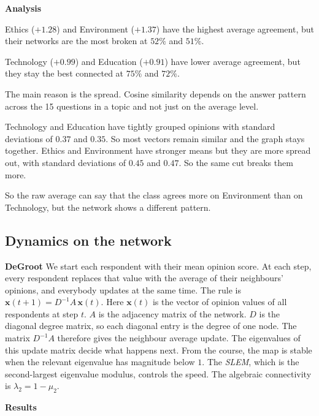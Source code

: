 \documentclass[11pt,a4paper]{article}
\newcommand{\lab}[1]{\textbf{#1}}
\begin{document}
\lab{Analysis}
\begin{dash}
  \item Ethics ($+1.28$) and Environment ($+1.37$) have the highest average
  agreement, but their networks are the most broken at $52\%$ and $51\%$.
  \item Technology ($+0.99$) and Education ($+0.91$) have lower average
  agreement, but they stay the best connected at $75\%$ and $72\%$.
  \item The main reason is the spread. Cosine similarity depends on the answer
  pattern across the 15 questions in a topic and not just on the average level.
  \item Technology and Education have tightly grouped opinions with standard
  deviations of $0.37$ and $0.35$. So most vectors remain similar and the graph
  stays together. Ethics and Environment have stronger means but they are more
  spread out, with standard deviations of $0.45$ and $0.47$. So the same cut
  breaks them more.
  \item So the raw average can say that the class agrees more on Environment
  than on Technology, but the network shows a different pattern.
\end{dash}

\subsection{Dynamics on the network}

\lab{DeGroot} We start each respondent with their mean opinion score. At each
step, every respondent replaces that value with the average of their
neighbours' opinions, and everybody updates at the same time. The rule is
$\mathbf{x}(t{+}1)=D^{-1}A\,\mathbf{x}(t)$. Here $\mathbf{x}(t)$ is the vector
of opinion values of all respondents at step $t$. $A$ is the adjacency matrix
of the network. $D$ is the diagonal degree matrix, so each diagonal entry is
the degree of one node. The matrix $D^{-1}A$ therefore gives the neighbour
average update. The eigenvalues of this update matrix decide what happens next.
From the course, the map is stable when the relevant eigenvalue has magnitude
below $1$. The \emph{SLEM}, which is the second-largest eigenvalue modulus,
controls the speed. The algebraic connectivity is $\lambda_2=1-\mu_2$.

\lab{Results}
\end{document}
